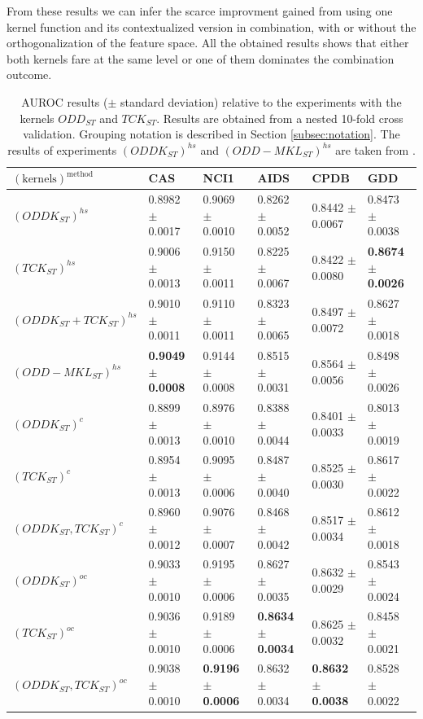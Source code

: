 From these results we can infer the scarce improvment gained from
using one kernel function and its contextualized version in combination, with or without
the orthogonalization of the feature space.
All the obtained results shows that either both kernels fare at the same level or
one of them dominates the combination outcome.

\begin{landscape}
    \begin{table}[ht]
        \centering
        \begin{tabular}{|l|l|l|l|l|l|}
            \hline
            $\mathrm{(kernels)^{method}}$&CAS&NCI1&AIDS&CPDB&GDD\\
            \hline
            $(ODDK_{ST})^{hs}$&0.8982 $\pm$ 0.0017&0.9069 $\pm$ 0.0010&0.8262 $\pm$ 0.0052&0.8442 $\pm$ 0.0067&0.8473 $\pm$ 0.0038\\
            $(TCK_{ST})^{hs}$&0.9006 $\pm$ 0.0013&0.9150 $\pm$ 0.0011&0.8225 $\pm$ 0.0067&0.8422 $\pm$ 0.0080&\textbf{0.8674 $\pm$ 0.0026}\\
            $(ODDK_{ST} + TCK_{ST})^{hs}$&0.9010 $\pm$ 0.0011&0.9110 $\pm$ 0.0011&0.8323 $\pm$ 0.0065&0.8497 $\pm$ 0.0072&0.8627 $\pm$ 0.0018\\
            $(ODD-MKL_{ST})^{hs}$&\textbf{0.9049 $\pm$ 0.0008}&0.9144 $\pm$ 0.0008&0.8515 $\pm$ 0.0031&0.8564 $\pm$ 0.0056&0.8498 $\pm$ 0.0026\\
            \hline
            $(ODDK_{ST})^c$&0.8899 $\pm$ 0.0013&0.8976 $\pm$ 0.0010 &0.8388 $\pm$ 0.0044&0.8401 $\pm$ 0.0033&0.8013 $\pm$ 0.0019\\
            $(TCK_{ST})^c$&0.8954 $\pm$ 0.0013&0.9095 $\pm$ 0.0006&0.8487 $\pm$ 0.0040&0.8525 $\pm$ 0.0030&0.8617 $\pm$ 0.0022\\
            $(ODDK_{ST}, TCK_{ST})^c$&0.8960 $\pm$  0.0012&0.9076 $\pm$ 0.0007&0.8468 $\pm$ 0.0042&0.8517 $\pm$ 0.0034&0.8612 $\pm$ 0.0018\\
            \hline
            $(ODDK_{ST})^{oc}$&0.9033 $\pm$ 0.0010&0.9195 $\pm$ 0.0006&0.8627 $\pm$ 0.0035&0.8632 $\pm$  0.0029&0.8543 $\pm$ 0.0024\\
            $(TCK_{ST})^{oc}$&0.9036 $\pm$ 0.0010&0.9189 $\pm$ 0.0006&\textbf{0.8634 $\pm$ 0.0034}&0.8625 $\pm$ 0.0032&0.8458 $\pm$ 0.0021\\
            $(ODDK_{ST}, TCK_{ST})^{oc}$&0.9038 $\pm$ 0.0010&\textbf{0.9196 $\pm$ 0.0006}&0.8632 $\pm$ 0.0034&\textbf{0.8632 $\pm$ 0.0038}&0.8528 $\pm$ 0.0022\\
            \hline
        \end{tabular}
        \caption{AUROC results ($\pm$ standard deviation) relative to the experiments
            with the kernels $ODD_{ST}$ and $TCK_{ST}$. Results are
            obtained from a nested 10-fold cross validation.
            Grouping notation is described in Section \ref{subsec:notation}.
            The results of experiments $(ODDK_{ST})^{hs}$ and $(ODD-MKL_{ST})^{hs}$ are taken from \cite{gmkl}.
        }
        \label{table:results_st}
        \medskip


\end{table}
\end{landscape}
